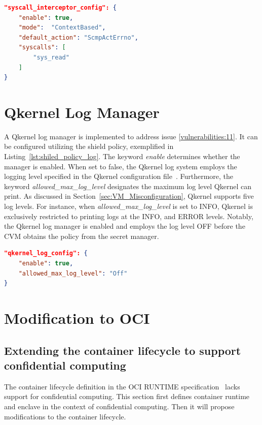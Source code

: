 \begin{lstlisting}[language=json, caption= System call interceptor's configuration in the shield policy, label={lst:shiled_policy_interceptor}]
"syscall_interceptor_config": {
    "enable": true,
    "mode":  "ContextBased",
    "default_action": "ScmpActErrno",
    "syscalls": [
        "sys_read"
    ]
}
\end{lstlisting}

\section{Qkernel Log Manager}
\label{sec:Qkernel_logger}
A Qkernel log manager is implemented to address issue \ref{vulnerabilities:11}. It can be configured utilizing the shield policy, exemplified in Listing~\ref{lst:shiled_policy_log}. The keyword \emph{enable} determines whether the manager is enabled. When set to false, the Qkernel log system employs the logging level specified in 
the Qkernel configuration file~\cite*{quark_conf_file}. Furthermore, the keyword \emph{allowed\_max\_log\_level} designates the maximum log level Qkernel can print. As discussed in Section~\ref{sec:VM_Misconfiguration}, Qkernel supports five log levels. For instance, when \emph{allowed\_max\_log\_level} is set to INFO, Qkernel is exclusively 
restricted to printing logs at the INFO, and ERROR levels. Notably, the Qkernel log manager is enabled and employs the log level OFF before the \acrshort{CVM} obtains the policy from the secret manager.

\begin{lstlisting}[language=json, caption= Qkernel log manager's configuration in the shield policy, label={lst:shiled_policy_log}]
"qkernel_log_config": {
    "enable": true,
    "allowed_max_log_level": "Off"
}
\end{lstlisting}
    

\section{Modification to OCI}
\label{sec:Modification_OCI}

\subsection{Extending the container lifecycle to support confidential computing}
The container lifecycle definition in the OCI RUNTIME specification~\cite*{oci-runtime-spec} lacks support for confidential computing. This section first defines container runtime and enclave in the context of confidential computing. Then it will propose modifications to the container 
lifecycle.


